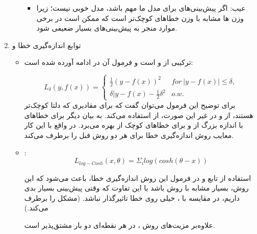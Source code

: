 \begin{enumerate}
\begin{itemize}
\begin{itemize}
			\item عیب:
			اگر پیش‌بینی‌های   برای مدل ما مهم باشد، مدل خوبی نیست؛ زیرا وزن ها مشابه با وزن خطاهای کوچک‌تر است که ممکن است در برخی موارد منجر به پیش‌بینی‌های بسیار ضعیفی شود.
		\end{itemize}
	\end{itemize}
	\item توابع اندازه‌گیری خطا  و 
	\begin{itemize}
		\item {} 
		ترکیبی از  و  است و فرمول آن در ادامه آورده شده است:
		
		$$
			L_{\delta}(y, f(x)) = \begin{cases}
				\frac{1}{2}(y - f(x)) ^ 2 & for \: |y - f(x)| \leq \delta, \\
				\delta |y - f(x) - \frac{1}{2} \delta^2 & o.w.
			\end{cases}
		$$
		برای توضیح این فرمول می‌توان گفت که برای مقادیری که دلتا کوچک‌تر هستند، از  و در غیر این صورت، از  استفاده می‌کند. به بیان دیگر برای خطاهای با اندازه بزرگ از  و برای خطاهای کوچک از  بهره می‌برد. در واقع با این کار معایب روش اندازه‌گیری خطا برای هر دو روش قبل را برطرف می‌کند.

		\item {}: 
		$$
		L_{log-Cosh}(x, \theta) = \Sigma_i log(cosh(\theta - x))
		$$
		
		استفاده از تابع  و  در فرمول این روش اندازه‌گیری خطا، باعث می‌شود که این روش، بسیار مشابه با روش  باشد با این تفاوت که وقتی پیش‌بینی بسیار بدی داریم، در مقایسه با ، خیلی روی خطا تاثیرگذار نباشد. (مشکل  را برطرف می‌کند.)
		
		علاوه‌بر مزیت‌های روش ، در هر نقطه‌ای دو بار مشتق‌‌پذیر است. 
	\end{itemize}
\end{enumerate}